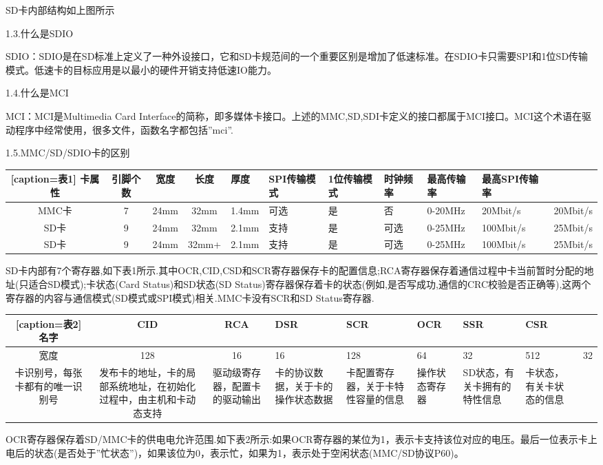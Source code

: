 SD卡内部结构如上图所示

1.3.什么是SDIO

SDIO：SDIO是在SD标准上定义了一种外设接口，它和SD卡规范间的一个重要区别是增加了低速标准。在SDIO卡只需要SPI和1位SD传输模式。低速卡的目标应用是以最小的硬件开销支持低速IO能力。

1.4.什么是MCI

MCI：MCI是Multimedia Card Interface的简称，即多媒体卡接口。上述的MMC,SD,SDI卡定义的接口都属于MCI接口。MCI这个术语在驱动程序中经常使用，很多文件，函数名字都包括”mci”.

1.5.MMC/SD/SDIO卡的区别

\begin{tabular}{|c|c|c|c|}[caption={表1}]
    \hline
    卡属性&引脚个数&宽度&长度&厚度&SPI传输模式&1位传输模式&时钟频率&最高传输率&最高SPI传输率\\
    \hline
    MMC卡&7&24mm&32mm&1.4mm&可选&是&否&0-20MHz&20Mbit/s&20Mbit/s \\
    \hline
    SD卡&9&24mm&32mm&2.1mm&支持&是&可选&0-25MHz&100Mbit/s&25Mbit/s \\
    \hline
    SD卡&9&24mm&32mm+&2.1mm&支持&是&可选&0-25MHz&100Mbit/s&25Mbit/s \\
    \hline
  \end{tabular}

SD卡内部有7个寄存器,如下表1所示.其中OCR,CID,CSD和SCR寄存器保存卡的配置信息;RCA寄存器保存着通信过程中卡当前暂时分配的地址(只适合SD模式);卡状态(Card Status)和SD状态(SD Status)寄存器保存着卡的状态(例如,是否写成功,通信的CRC校验是否正确等),这两个寄存器的内容与通信模式(SD模式或SPI模式)相关.MMC卡没有SCR和SD Status寄存器.

\begin{tabular}{|c|c|c|}[caption={表2}]
    \hline
    名字 & CID & RCA & DSR & SCR & OCR &SSR &CSR \\
    \hline
    宽度 & 128 & 16 & 16 & 128 & 64 & 32 & 512 & 32 \\
    \hline
    卡识别号，每张卡都有的唯一识别号 & 发布卡的地址，卡的局部系统地址，在初始化过程中，由主机和卡动态支持 & 驱动级寄存器，配置卡的驱动输出 &
    卡的协议数据，关于卡的操作状态数据 & 卡配置寄存器，关于卡特性容量的信息 & 操作状态寄存器&
    SD状态，有关卡拥有的特性信息 & 卡状态，有关卡状态的信息 \\
    \hline
\end{tabular}

OCR寄存器保存着SD/MMC卡的供电电允许范围.如下表2所示:如果OCR寄存器的某位为1，表示卡支持该位对应的电压。最后一位表示卡上电后的状态(是否处于”忙状态”)，如果该位为0，表示忙，如果为1，表示处于空闲状态(MMC/SD协议P60)。


